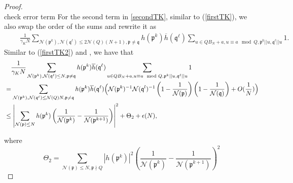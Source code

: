 \documentclass[11pt]{amsart}
\theoremstyle{definition}
\newcommand{\NN}{{\mathcal N}}
\newcommand{\Z}{{\mathbb Z}}
\newcommand{\mf}{\mathfrak}
\begin{document}
\begin{proof}
\begin{equation}
\end{equation}
{\color{red} check error term}
For the second term in \eqref{secondTK}, similar to (\ref{firstTK}), we also swap the order of the sums and rewrite it as
\begin{equation}
    \begin{split}
        &\quad \frac{1}{\gamma_{K} N}\sum_{\NN(\mf p^{k}),\NN(\mf q^{\ell}) \leq 2\NN(Q)(N+1), \mf p\neq \mf q} h(\mf p^{k})\overline{h}(\mf q^{\ell})\sum_{u\in QB_N+a, u\equiv a \mod Q, \mf p^{k}||u, \mf q^{\ell}||u}1.
    \end{split}
\end{equation}
Similar to (\ref{firstTK2}) and , we have that
\begin{equation}
    \begin{split}
        &\quad \frac{1}{\gamma_{K} N}\sum_{\NN(\mf p^{k}),\NN(\mf q^{\ell}) \leq N, \mf p\neq \mf q} h(\mf p^{k})\overline{h}(\mf q^{\ell})\sum_{u\in QB_N+a, u\equiv a \mod Q, \mf p^{k}||u, \mf q^{\ell}||u}1
        \\&=\sum_{\NN(\mf p^{k}),\NN(\mf q^{\ell})\leq \NN(Q)N, \mf p\neq \mf q} h(\mf p^{k})\overline{h}(\mf q^{\ell})\Bigl(\NN(\mf p^k)^{-1}\NN(\mf q^l)^{-1}\left(1-\frac{1}{\NN(\mf p)}\right) \left(1-\frac{1}{\NN(\mf q)}\right)+O(\frac{1}{N})\Bigr)
        \\&\leq \left|\sum_{\NN(\mf p) \leq N} h(\mf p^{k})\left( \frac{1}{\NN(\mf p^k)}-\frac{1}{\NN(\mf p^{k+1})}\right)\right|^2+\Theta_2+\epsilon(N),
    \end{split}
\end{equation}

where 
\[
\Theta_2=\sum_{\NN(\mf p) \leq N, \mf p \nmid Q} |h(\mf p^k)|^2 \left( \frac{1}{\NN(\mf p^k)}-\frac{1}{\NN(\mf p^{k+1})}\right)^2
\]


\end{proof}
\end{document}
